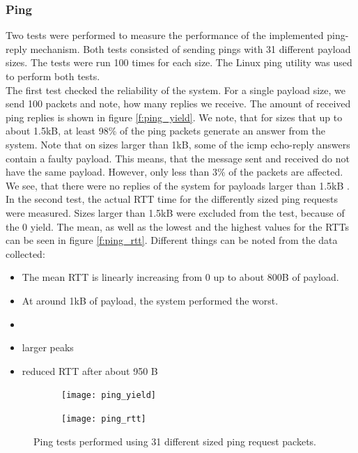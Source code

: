 \subsubsection{Ping}
Two tests were performed to measure the performance of the implemented ping-reply mechanism. Both tests consisted of sending pings with 31 different payload sizes. The tests were run 100 times for each size. The Linux ping utility was used to perform both tests.\\
The first test checked the reliability of the system. For a single payload size, we send 100 packets and note, how many replies we receive. The amount of received ping replies is shown in figure \ref{f:ping_yield}. We note, that for sizes that up to about 1.5kB, at least 98\% of the ping packets generate an answer from the system. Note that on sizes larger than 1kB, some of the icmp echo-reply answers contain a faulty payload. This means, that the message sent and received do not have the same payload. However, only less than 3\% of the packets are affected. We see, that there were no replies of the system for payloads larger than 1.5kB .\\
In the second test, the actual RTT time for the differently sized ping requests were measured. Sizes larger than 1.5kB were excluded from the test, because of the 0 yield. The mean, as well as the lowest and the highest values for the RTTs can be seen in figure \ref{f:ping_rtt}. Different things can be noted from the data collected: 
\begin{itemize}
	\item The mean RTT is linearly increasing from 0 up to about 800B of payload. 
	\item At around 1kB of payload, the system performed the worst. 
	\item {}
	\item larger peaks
	\item reduced RTT after about 950 B
\end{itemize}

\begin{figure}
	\begin{subfigure}[c]{0.50\textwidth}
	\centering
		\texttt{[image: ping\_yield]}
	\end{subfigure}
\begin{subfigure}[c]{0.50\textwidth}
\centering
		\texttt{[image: ping\_rtt]}
	\end{subfigure}
	\caption{Ping tests performed using 31 different sized ping request packets.}
	\label{f:ping_figure}
\end{figure}


